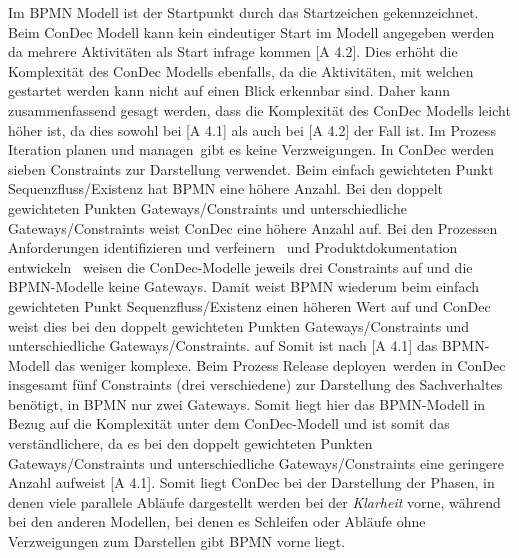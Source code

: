 Im BPMN Modell ist der Startpunkt durch das Startzeichen gekennzeichnet. Beim ConDec Modell kann kein eindeutiger Start im Modell angegeben werden da mehrere Aktivitäten als Start infrage kommen [A 4.2]. Dies erhöht die Komplexität des ConDec Modells ebenfalls, da die Aktivitäten, mit welchen gestartet werden kann nicht auf einen Blick erkennbar sind. \newline
Daher kann zusammenfassend gesagt werden, dass die Komplexität des ConDec Modells leicht höher ist, da dies sowohl bei [A 4.1] als auch bei [A 4.2] der Fall ist.\newline
Im Prozess  \grqq Iteration planen und managen\grqq \ gibt es keine Verzweigungen. In ConDec werden sieben Constraints zur Darstellung verwendet. Beim einfach gewichteten Punkt Sequenzfluss/Existenz hat BPMN eine höhere Anzahl. Bei den doppelt gewichteten Punkten Gateways/Constraints und unterschiedliche Gateways/Constraints weist ConDec eine höhere Anzahl auf.\newline
Bei den Prozessen  \grqq Anforderungen identifizieren und verfeinern \grqq \ und  \grqq Produktdokumentation entwickeln \grqq \ weisen die ConDec-Modelle jeweils drei Constraints auf und die BPMN-Modelle keine Gateways. Damit weist BPMN wiederum beim einfach gewichteten Punkt Sequenzfluss/Existenz einen höheren Wert auf und ConDec weist dies bei den doppelt gewichteten Punkten Gateways/Constraints und unterschiedliche Gateways/Constraints. auf Somit ist nach [A 4.1] das BPMN-Modell das weniger komplexe.\newline
Beim Prozess \grqq Release deployen\grqq \ werden in ConDec insgesamt fünf Constraints (drei verschiedene) zur Darstellung des Sachverhaltes benötigt, in BPMN nur zwei Gateways. Somit liegt hier das BPMN-Modell in Bezug auf die Komplexität unter dem ConDec-Modell und ist somit das verständlichere, da es bei den doppelt gewichteten Punkten Gateways/Constraints und unterschiedliche Gateways/Constraints eine geringere Anzahl aufweist [A 4.1].\newline
Somit liegt ConDec bei der Darstellung der Phasen, in denen viele parallele Abläufe dargestellt werden bei der \textit{Klarheit} vorne, während bei den anderen Modellen, bei denen es Schleifen oder Abläufe ohne Verzweigungen zum Darstellen gibt BPMN vorne liegt.\newline

